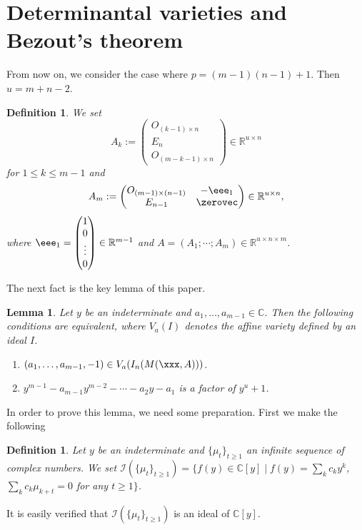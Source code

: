 \documentclass[a4paper,12pt]{article}
\newcommand{\CCC}{\mathbb{C}}
\newcommand{\RRR}{\mathbb{R}}
\newcommand{\msIII}{\mathscr{I}}
\newcommand{\define}{\mathrel{:=}}
\newtheorem{lemma}[thm]{Lemma}
\newtheorem{definition}[thm]{Definition}
\begin{document}
\section{Determinantal varieties and Bezout's theorem}


From now on, we consider the case where $p=(m-1)(n-1)+1$.
Then $u=m+n-2$.


\begin{definition}\rm
We set
$$
A_k\define\begin{pmatrix}O_{(k-1)\times n}\\ E_n\\ O_{(m-k-1)\times n}\end{pmatrix}
\in\RRR^{u\times n}
$$
for $1\leq k\leq m-1$ and
$$
A_{m}\define\begin{pmatrix}O_{(m-1)\times(n-1)}&-\eee_1\\ E_{n-1}&\zerovec\end{pmatrix}
\in\RRR^{u\times n},
$$
where $\eee_1=\begin{pmatrix}1\\0\\\vdots\\0\end{pmatrix}\in\RRR^{m-1}$
and $A=(A_1;\cdots;A_m)\in\RRR^{u\times n\times m}$.
\end{definition}


The next fact is the key lemma of this paper.

\begin{lemma}
\label{lem:key}
Let $y$ be an indeterminate and $a_1,\ldots, a_{m-1}\in\CCC$.
Then the following conditions are equivalent,
where $V_a(I)$ denotes the affine variety defined by an ideal $I$.
\begin{enumerate}
\item
$(a_1,\ldots, a_{m-1},-1)\in V_a(I_n(M(\xxx,A)))$.
\item
$y^{m-1}-a_{m-1}y^{m-2}-\cdots-a_2y-a_1$ is a factor of $y^u+1$.
\end{enumerate}
\end{lemma}


In order to prove this lemma, we need some preparation.
First we make the following

\begin{definition}\rm
Let $y$ be an indeterminate and 
$\{\mu_t\}_{t\geq 1}$ an infinite sequence of complex numbers.
We set $\msIII(\{\mu_t\}_{t\geq 1})
=\{f(y)\in\CCC[y]\mid f(y)=\sum_k c_k y^k$,
$\sum_k c_k\mu_{k+t}=0$ for any $t\geq 1\}$.
\end{definition}
%
%
It is easily verified that $\msIII(\{\mu_t\}_{t\geq 1})$ is an ideal of 
$\CCC[y]$.
\end{document}
